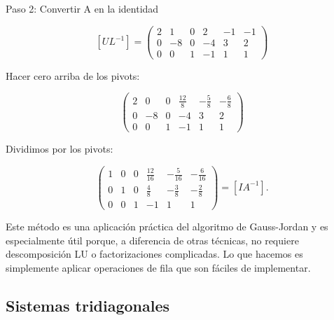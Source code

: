 Paso 2: Convertir A en la identidad

\[
[U L^{-1}] = \begin{pmatrix}
2 & 1 & 0 & 2 & -1 & -1 \\
0 & -8 & 0 & -4 & 3 & 2 \\
0 & 0 & 1 & -1 & 1 & 1
\end{pmatrix} 
\]

Hacer cero arriba de los pivots:

\[
\begin{pmatrix}
2 & 0 & 0 & \frac{12}{8} & -\frac{5}{8} & -\frac{6}{8} \\
0 & -8 & 0 & -4 & 3 & 2 \\
0 & 0 & 1 & -1 & 1 & 1
\end{pmatrix}
\]

Dividimos por los pivots:

\[
\begin{pmatrix}
1 & 0 & 0 & \frac{12}{16} & -\frac{5}{16} & -\frac{6}{16} \\
0 & 1 & 0 & \frac{4}{8} & -\frac{3}{8} & -\frac{2}{8} \\
0 & 0 & 1 & -1 & 1 & 1
\end{pmatrix} = [I A^{-1}].
\]


Este método es una aplicación práctica del algoritmo de Gauss-Jordan y es especialmente útil porque, a diferencia de otras técnicas, no requiere descomposición LU o factorizaciones complicadas. Lo que hacemos es simplemente aplicar operaciones de fila que son fáciles de implementar.




\subsection{Sistemas tridiagonales}
\label{sec:tridiagonal}

